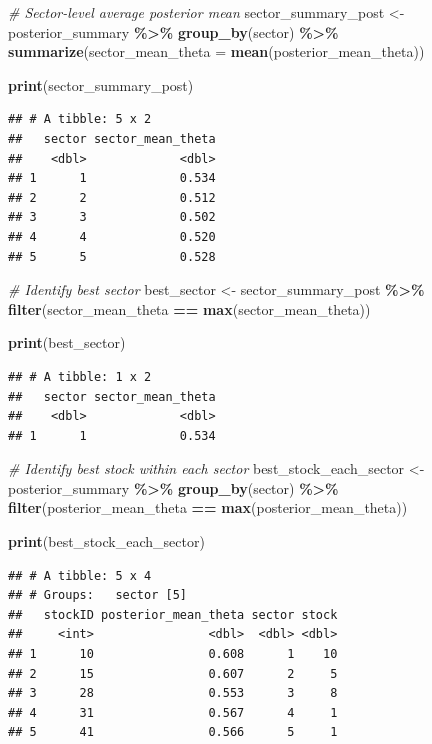 \documentclass[
  11pt,
]{article}
\newenvironment{Shaded}{\begin{snugshade}}{\end{snugshade}}
\newcommand{\AttributeTok}[1]{\textcolor[rgb]{0.13,0.29,0.53}{#1}}
\newcommand{\CommentTok}[1]{\textcolor[rgb]{0.56,0.35,0.01}{\textit{#1}}}
\newcommand{\FunctionTok}[1]{\textcolor[rgb]{0.13,0.29,0.53}{\textbf{#1}}}
\newcommand{\NormalTok}[1]{#1}
\newcommand{\OtherTok}[1]{\textcolor[rgb]{0.56,0.35,0.01}{#1}}
\newcommand{\SpecialCharTok}[1]{\textcolor[rgb]{0.81,0.36,0.00}{\textbf{#1}}}
\begin{document}
\begin{Shaded}
\begin{Highlighting}[]
\CommentTok{\# Sector{-}level average posterior mean}
\NormalTok{sector\_summary\_post }\OtherTok{\textless{}{-}}\NormalTok{ posterior\_summary }\SpecialCharTok{\%\textgreater{}\%}
  \FunctionTok{group\_by}\NormalTok{(sector) }\SpecialCharTok{\%\textgreater{}\%}
  \FunctionTok{summarize}\NormalTok{(}\AttributeTok{sector\_mean\_theta =} \FunctionTok{mean}\NormalTok{(posterior\_mean\_theta))}

\FunctionTok{print}\NormalTok{(sector\_summary\_post)}
\end{Highlighting}
\end{Shaded}

\begin{verbatim}
## # A tibble: 5 x 2
##   sector sector_mean_theta
##    <dbl>             <dbl>
## 1      1             0.534
## 2      2             0.512
## 3      3             0.502
## 4      4             0.520
## 5      5             0.528
\end{verbatim}

\begin{Shaded}
\begin{Highlighting}[]
\CommentTok{\# Identify best sector}
\NormalTok{best\_sector }\OtherTok{\textless{}{-}}\NormalTok{ sector\_summary\_post }\SpecialCharTok{\%\textgreater{}\%}
  \FunctionTok{filter}\NormalTok{(sector\_mean\_theta }\SpecialCharTok{==} \FunctionTok{max}\NormalTok{(sector\_mean\_theta))}

\FunctionTok{print}\NormalTok{(best\_sector)}
\end{Highlighting}
\end{Shaded}

\begin{verbatim}
## # A tibble: 1 x 2
##   sector sector_mean_theta
##    <dbl>             <dbl>
## 1      1             0.534
\end{verbatim}

\begin{Shaded}
\begin{Highlighting}[]
\CommentTok{\# Identify best stock within each sector}
\NormalTok{best\_stock\_each\_sector }\OtherTok{\textless{}{-}}\NormalTok{ posterior\_summary }\SpecialCharTok{\%\textgreater{}\%}
  \FunctionTok{group\_by}\NormalTok{(sector) }\SpecialCharTok{\%\textgreater{}\%}
  \FunctionTok{filter}\NormalTok{(posterior\_mean\_theta }\SpecialCharTok{==} \FunctionTok{max}\NormalTok{(posterior\_mean\_theta))}

\FunctionTok{print}\NormalTok{(best\_stock\_each\_sector)}
\end{Highlighting}
\end{Shaded}

\begin{verbatim}
## # A tibble: 5 x 4
## # Groups:   sector [5]
##   stockID posterior_mean_theta sector stock
##     <int>                <dbl>  <dbl> <dbl>
## 1      10                0.608      1    10
## 2      15                0.607      2     5
## 3      28                0.553      3     8
## 4      31                0.567      4     1
## 5      41                0.566      5     1
\end{verbatim}
\end{document}
